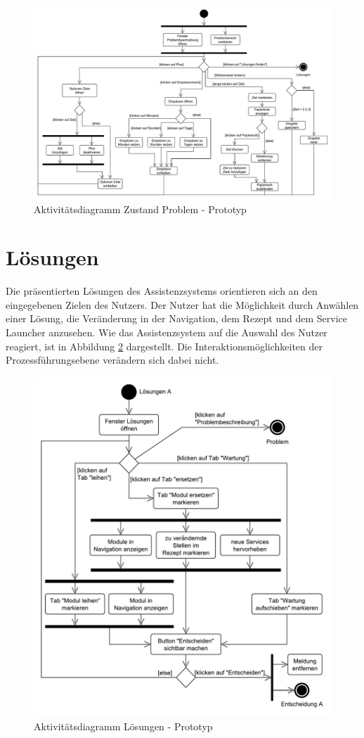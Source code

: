\begin{figure}[tbp]
\centering
\includegraphics[angle=90,scale=0.5]{DA_files/UML/Prototyp/Aktivitaetsdiagramm-Problem.pdf}
\caption{Aktivitätsdiagramm Zustand Problem - Prototyp}
\label{pic:Aktivitaetsdiagramm-Problem}
\end{figure}

\section{Lösungen}
\label{5:Loesungen}
Die präsentierten Lösungen des Assistenzsystems orientieren sich an den eingegebenen Zielen des Nutzers. Der Nutzer hat die Möglichkeit durch Anwählen einer Lösung, die Veränderung in der Navigation, dem Rezept und dem Service Launcher anzusehen. Wie das Assistenzsystem auf die Auswahl des Nutzer reagiert, ist in Abbildung \ref{pic:Aktivitaetsdiagramm-Loesungen} dargestellt. Die Interaktionsmöglichkeiten der Prozessführungsebene verändern sich dabei nicht.

\begin{figure}[htbp]
\centering
\includegraphics[scale=0.6]{DA_files/UML/Prototyp/Aktivitaetsdiagramm-Loesungen.pdf}
\caption{Aktivitätsdiagramm Lösungen - Prototyp}
\label{pic:Aktivitaetsdiagramm-Loesungen}
\end{figure}